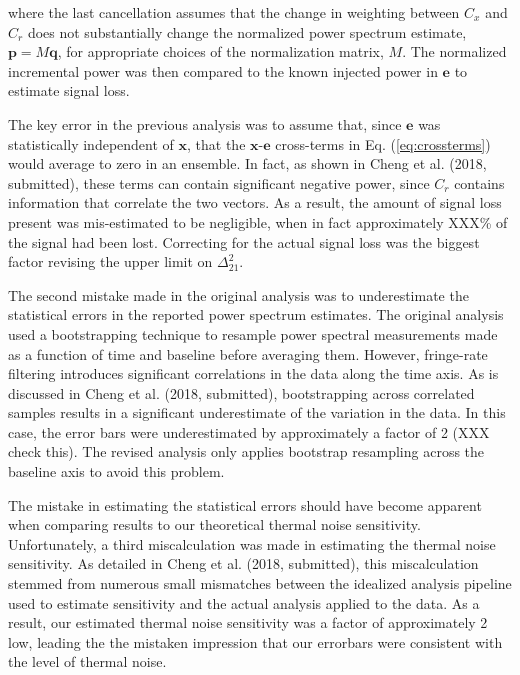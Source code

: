 \documentclass[onecolumn]{emulateapj} \shorttitle{}
\newcommand{\chengcitet}{Cheng et al. (2018, submitted)}
\begin{document}
where the last cancellation assumes that the change in weighting between $C_{x}$ and $C_r$ does not substantially change
the normalized power spectrum estimate, ${\mathbf p}=M{\mathbf q}$, for appropriate choices of the normalization matrix, $M$.
The normalized incremental power was then compared to the known injected power in $\mathbf e$ to estimate signal loss.

The key error in the previous analysis was to assume that, since $\mathbf e$ was statistically independent of $\mathbf x$, that
the $\mathbf x$-$\mathbf e$ cross-terms in Eq. (\ref{eq:crossterms}) would average to zero in an ensemble.  In fact, as shown
in \chengcitet, these terms can contain significant negative power, since $C_r$ contains information that correlate the
two vectors.  As a result, the amount of signal loss present was mis-estimated to be negligible, when in fact approximately
XXX\% of the signal had been lost. Correcting for the actual signal loss was the biggest factor revising the upper limit
on $\Delta^2_{21}$.

The second mistake made in the original analysis was to underestimate the statistical errors in the reported power spectrum
estimates.  The original analysis used a bootstrapping technique to resample power spectral measurements made as a function
of time and baseline before averaging them.  However, fringe-rate filtering introduces significant correlations in the data
along the time axis.  As is discussed in \chengcitet, bootstrapping across correlated samples results in a significant underestimate
of the variation in the data.  In this case, the error bars were underestimated by approximately a factor of 2 (XXX check this).
The revised analysis only applies bootstrap resampling across the baseline axis to avoid this problem.

The mistake in estimating the statistical errors should have become apparent when comparing results to our theoretical
thermal noise sensitivity.  Unfortunately, a third miscalculation was made in estimating the thermal noise sensitivity.
As detailed in \chengcitet, this miscalculation stemmed from numerous small mismatches between the idealized analysis
pipeline used to estimate sensitivity and the actual analysis applied to the data.  As a result, our estimated thermal
noise sensitivity was a factor of approximately 2 low, leading the the mistaken impression that our
errorbars were consistent with the level of thermal noise.
\end{document}
